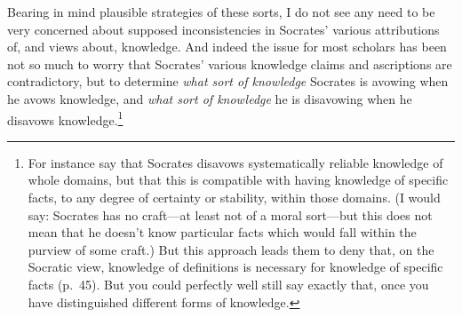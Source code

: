 \documentclass[11pt,letterpaper,oneside]{amsart} %
\begin{document}





















Bearing in mind plausible strategies of these sorts, I do not see any need to be very concerned about supposed inconsistencies in Socrates' various attributions of, and views about, knowledge. And indeed the issue for most scholars has been not so much to worry that Socrates' various knowledge claims and ascriptions are contradictory, but to determine \emph{what sort of knowledge} Socrates is avowing when he avows knowledge, and \emph{what sort of knowledge} he is disavowing when he disavows knowledge.\footnote{For instance \citet[esp.\ p.\ 36]{brickhouse1994pss} say that Socrates disavows systematically reliable knowledge of whole domains, but that this is compatible with having knowledge of specific facts, to any degree of certainty or stability, within those domains. (I would say: Socrates has no craft---at least not of a moral sort---but this does not mean that he doesn't know particular facts which would fall within the purview of some craft.) But this approach leads them to deny that, on the Socratic view, knowledge of definitions is necessary for knowledge of specific facts (p.\ 45). But you could perfectly well still say exactly that, once you have distinguished different forms of knowledge.}
\end{document}
